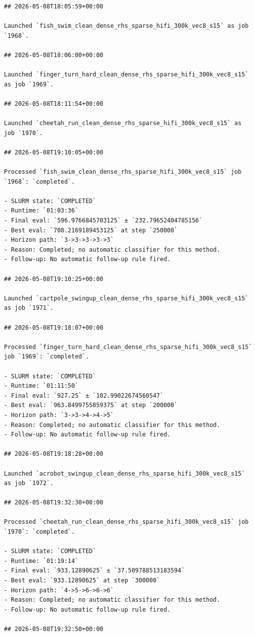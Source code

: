 \begin{verbatim}
## 2026-05-08T18:05:59+00:00

Launched `fish_swim_clean_dense_rhs_sparse_hifi_300k_vec8_s15` as job `1968`.

## 2026-05-08T18:06:00+00:00

Launched `finger_turn_hard_clean_dense_rhs_sparse_hifi_300k_vec8_s15` as job `1969`.

## 2026-05-08T18:11:54+00:00

Launched `cheetah_run_clean_dense_rhs_sparse_hifi_300k_vec8_s15` as job `1970`.

## 2026-05-08T19:10:05+00:00

Processed `fish_swim_clean_dense_rhs_sparse_hifi_300k_vec8_s15` job `1968`: `completed`.

- SLURM state: `COMPLETED`
- Runtime: `01:03:36`
- Final eval: `596.9766845703125` ± `232.79652404785156`
- Best eval: `708.2169189453125` at step `250000`
- Horizon path: `3->3->3->3->3`
- Reason: Completed; no automatic classifier for this method.
- Follow-up: No automatic follow-up rule fired.

## 2026-05-08T19:10:25+00:00

Launched `cartpole_swingup_clean_dense_rhs_sparse_hifi_300k_vec8_s15` as job `1971`.

## 2026-05-08T19:18:07+00:00

Processed `finger_turn_hard_clean_dense_rhs_sparse_hifi_300k_vec8_s15` job `1969`: `completed`.

- SLURM state: `COMPLETED`
- Runtime: `01:11:50`
- Final eval: `927.25` ± `102.99022674560547`
- Best eval: `963.8499755859375` at step `200000`
- Horizon path: `3->3->4->4->5`
- Reason: Completed; no automatic classifier for this method.
- Follow-up: No automatic follow-up rule fired.

## 2026-05-08T19:18:28+00:00

Launched `acrobot_swingup_clean_dense_rhs_sparse_hifi_300k_vec8_s15` as job `1972`.

## 2026-05-08T19:32:30+00:00

Processed `cheetah_run_clean_dense_rhs_sparse_hifi_300k_vec8_s15` job `1970`: `completed`.

- SLURM state: `COMPLETED`
- Runtime: `01:19:14`
- Final eval: `933.12890625` ± `37.509788513183594`
- Best eval: `933.12890625` at step `300000`
- Horizon path: `4->5->6->6->6`
- Reason: Completed; no automatic classifier for this method.
- Follow-up: No automatic follow-up rule fired.

## 2026-05-08T19:32:50+00:00


\end{verbatim}
